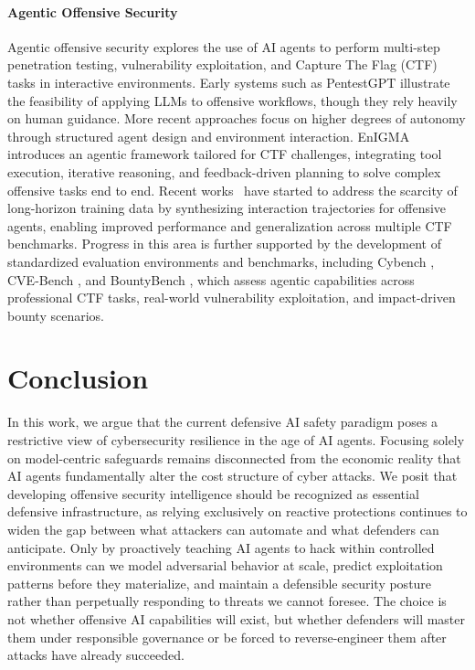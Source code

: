 \documentclass{article}
\theoremstyle{plain}
\theoremstyle{definition}
\theoremstyle{remark}
\begin{document}
\paragraph{Agentic Offensive Security}
Agentic offensive security explores the use of AI agents to perform multi-step penetration testing, vulnerability exploitation, and Capture The Flag (CTF) tasks in interactive environments. Early systems such as PentestGPT \citep{deng2024pentestgpt} illustrate the feasibility of applying LLMs to offensive workflows, though they rely heavily on human guidance. More recent approaches focus on higher degrees of autonomy through structured agent design and environment interaction. EnIGMA \citep{abramovichenigma} introduces an agentic framework tailored for CTF challenges, integrating tool execution, iterative reasoning, and feedback-driven planning to solve complex offensive tasks end to end. Recent works~\citep{zhuo2025cyber,zhuo2025training} have started to address the scarcity of long-horizon training data by synthesizing interaction trajectories for offensive agents, enabling improved performance and generalization across multiple CTF benchmarks. Progress in this area is further supported by the development of standardized evaluation environments and benchmarks, including Cybench \citep{zhang2025cybench}, CVE-Bench \citep{zhu2025cvebench}, and BountyBench \citep{zhang2025bountybench}, which assess agentic capabilities across professional CTF tasks, real-world vulnerability exploitation, and impact-driven bounty scenarios.



\section{Conclusion}
In this work, we argue that the current defensive AI safety paradigm poses a restrictive view of cybersecurity resilience in the age of AI agents. Focusing solely on model-centric safeguards remains disconnected from the economic reality that AI agents fundamentally alter the cost structure of cyber attacks. We posit that developing offensive security intelligence should be recognized as essential defensive infrastructure, as relying exclusively on reactive protections continues to widen the gap between what attackers can automate and what defenders can anticipate. Only by proactively teaching AI agents to hack within controlled environments can we model adversarial behavior at scale, predict exploitation patterns before they materialize, and maintain a defensible security posture rather than perpetually responding to threats we cannot foresee. The choice is not whether offensive AI capabilities will exist, but whether defenders will master them under responsible governance or be forced to reverse-engineer them after attacks have already succeeded.
\end{document}
